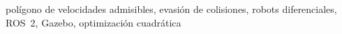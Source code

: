 \begin{IEEEkeywords}
polígono de velocidades admisibles, evasión de colisiones, robots diferenciales, ROS~2, Gazebo, optimización cuadrática
\end{IEEEkeywords}
